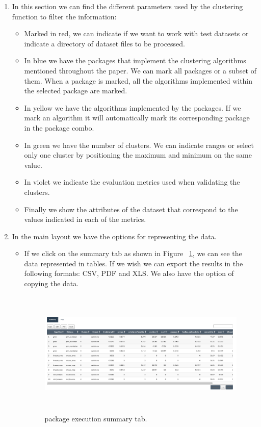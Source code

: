 \begin{enumerate}
  \item In this section we can find the different parameters used by the clustering function to filter the information:
  \begin{itemize}
  \item Marked in red, we can indicate if we want to work with test datasets or indicate a directory of dataset files to be processed.
  \item In blue we have the packages that implement the clustering algorithms mentioned throughout the paper. We can mark all packages or a subset of them. When a package is marked, all the algorithms implemented within the selected package are marked.
  \item In yellow we have the algorithms implemented by the packages. If we mark an algorithm it will automatically mark its corresponding package in the package combo.
  \item In green we have the number of clusters. We can indicate ranges or select only one cluster by positioning the maximum and minimum on the same value.
  \item In violet we indicate the evaluation metrics used when validating the clusters.
  \item Finally we show the attributes of the dataset that correspond to the values indicated in each of the metrics.
\end{itemize}
  \item In the main layout we have the options for representing the data.
  \begin{itemize}

    \item If we click on the summary tab as shown in Figure ~\ref{fig:tab_summary}, we can see the data represented in tables. If we wish we can export the results in the following formats: CSV, PDF and XLS. We also have the option of copying the data.

  \begin{figure}[htbp]
    \centering
     \includegraphics[width=14cm, height=6cm]{img/tab_summary}
      \caption{ package execution summary tab.}
      \label{fig:tab_summary}
  \end{figure}


\end{itemize}
\end{enumerate}
